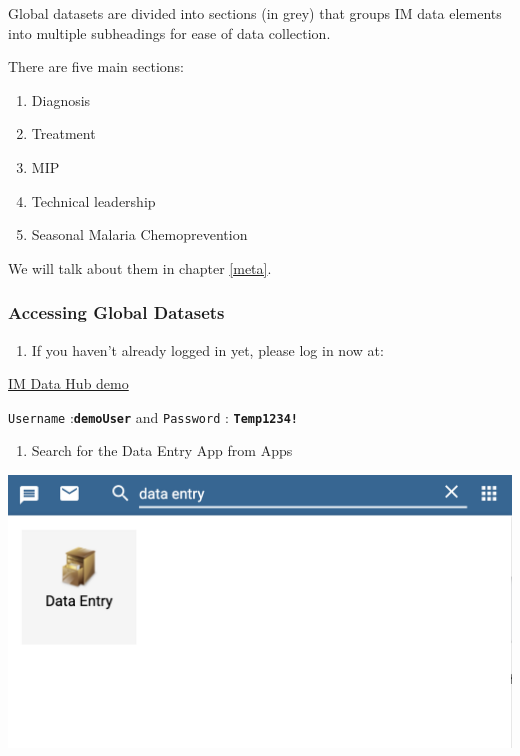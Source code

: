 \documentclass[]{book}
\providecommand{\tightlist}{%
  \setlength{\itemsep}{0pt}\setlength{\parskip}{0pt}}
\begin{document}
Global datasets are divided into sections (in grey) that groups IM data elements into multiple subheadings for ease of data collection.

There are five main sections:

\begin{enumerate}
\def\labelenumi{\arabic{enumi}.}
\tightlist
\item
  Diagnosis
\item
  Treatment
\item
  MIP
\item
  Technical leadership
\item
  Seasonal Malaria Chemoprevention
\end{enumerate}

We will talk about them in chapter \ref{meta}.

\hypertarget{access-global-datasets}{%
\subsubsection{Accessing Global Datasets}\label{access-global-datasets}}

\begin{enumerate}
\def\labelenumi{\arabic{enumi}.}
\tightlist
\item
  If you haven't already logged in yet, please log in now at:
\end{enumerate}

\href{https://im-dev.psi-mis.org/dhis-web-dataentry/index.action}{IM Data Hub demo}

\texttt{Username} :\textbf{\texttt{demoUser}} and \texttt{Password} : \textbf{\texttt{Temp1234!}}

\begin{enumerate}
\def\labelenumi{\arabic{enumi}.}
\setcounter{enumi}{1}
\tightlist
\item
  Search for the Data Entry App from Apps
\end{enumerate}

\includegraphics[width=15.28in]{./images/data-entry-app2}
\end{document}
